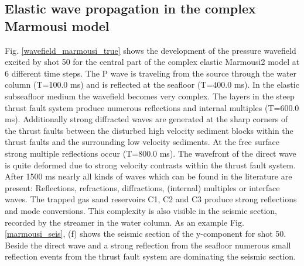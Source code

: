 \subsection{Elastic wave propagation in the complex Marmousi model}
\label{marmousi_complex}
Fig. \ref{wavefield_marmousi_true} shows the development of the pressure wavefield excited by shot 50 for the central part of the complex elastic Marmousi2 model at 6 different time steps. The P wave is traveling from the source through the water column (T=100.0 ms) and is reflected at the seafloor (T=400.0 ms). In the elastic subseafloor medium the wavefield becomes very complex. The layers in the steep thrust fault system produce numerous reflections and internal multiples (T=600.0 ms). Additionally strong diffracted waves are generated at the sharp corners of the thrust faults between the disturbed high velocity sediment blocks within the thrust faults and the surrounding low velocity sediments. At the free surface strong multiple reflections occur (T=800.0 ms). The wavefront of the direct wave is quite deformed due to strong velocity contrasts within the thrust fault system. After 1500 ms nearly all kinds of waves which can be found in the literature are present: Reflections, refractions, diffractions, (internal) multiples or interface waves. The trapped gas sand reservoirs C1, C2 and C3 produce strong reflections and mode conversions. This complexity is also visible in the seismic section, recorded by the streamer in the water column. As an example Fig. \ref{marmousi_seis}, (f) shows the seismic section of the y-component for shot 50. Beside the direct wave and a strong reflection from the seafloor numerous small reflection events from the thrust fault system are dominating the seismic section.  
